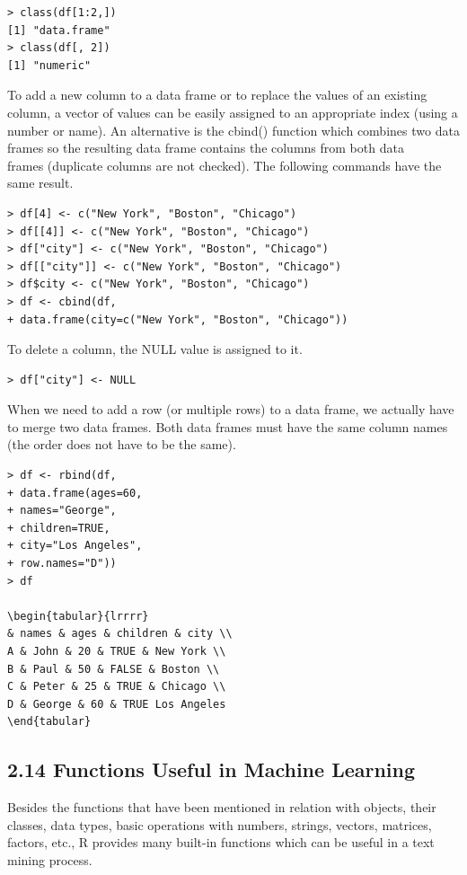 \documentclass[10pt]{book}
\begin{document}
\begin{verbatim}
> class(df[1:2,])
[1] "data.frame"
> class(df[, 2])
[1] "numeric"
\end{verbatim}

To add a new column to a data frame or to replace the values of an existing column, a vector of values can be easily assigned to an appropriate index (using a number or name). An alternative is the cbind() function which combines two data frames so the resulting data frame contains the columns from both data\\
frames (duplicate columns are not checked). The following commands have the same result.

\begin{verbatim}
> df[4] <- c("New York", "Boston", "Chicago")
> df[[4]] <- c("New York", "Boston", "Chicago")
> df["city"] <- c("New York", "Boston", "Chicago")
> df[["city"]] <- c("New York", "Boston", "Chicago")
> df$city <- c("New York", "Boston", "Chicago")
> df <- cbind(df,
+ data.frame(city=c("New York", "Boston", "Chicago"))
\end{verbatim}

To delete a column, the NULL value is assigned to it.

\begin{verbatim}
> df["city"] <- NULL
\end{verbatim}

When we need to add a row (or multiple rows) to a data frame, we actually have to merge two data frames. Both data frames must have the same column names (the order does not have to be the same).

\begin{verbatim}
> df <- rbind(df,
+ data.frame(ages=60,
+ names="George",
+ children=TRUE,
+ city="Los Angeles",
+ row.names="D"))
> df

\begin{tabular}{lrrrr} 
& names & ages & children & city \\
A & John & 20 & TRUE & New York \\
B & Paul & 50 & FALSE & Boston \\
C & Peter & 25 & TRUE & Chicago \\
D & George & 60 & TRUE Los Angeles
\end{tabular}
\end{verbatim}

\subsection*{2.14 Functions Useful in Machine Learning}
Besides the functions that have been mentioned in relation with objects, their classes, data types, basic operations with numbers, strings, vectors, matrices, factors, etc., R provides many built-in functions which can be useful in a text mining process.
\end{document}
